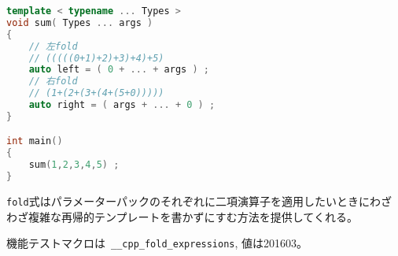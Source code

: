 \begin{lstlisting}[language=C++]
template < typename ... Types >
void sum( Types ... args )
{
    // 左fold
    // (((((0+1)+2)+3)+4)+5)
    auto left = ( 0 + ... + args ) ;
    // 右fold
    // (1+(2+(3+(4+(5+0)))))
    auto right = ( args + ... + 0 ) ;
}

int main()
{
    sum(1,2,3,4,5) ;
}
\end{lstlisting}

\lstinline!fold!式はパラメーターパックのそれぞれに二項演算子を適用したいときにわざわざ複雑な再帰的テンプレートを書かずにすむ方法を提供してくれる。

機能テストマクロは~\lstinline!__cpp_fold_expressions!, 値は201603。

